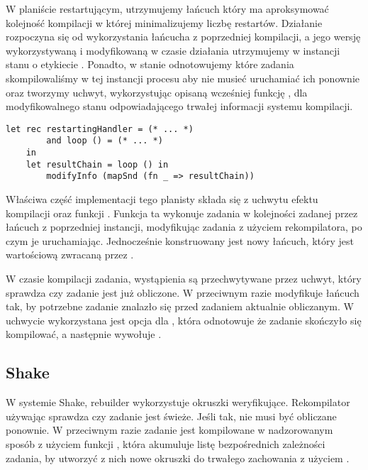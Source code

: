 

W planiście restartującym, utrzymujemy łańcuch który ma aproksymować kolejność kompilacji w której minimalizujemy liczbę restartów. Działanie rozpoczyna się od wykorzystania łańcucha z poprzedniej kompilacji, a jego wersję wykorzystywaną i modyfikowaną w czasie działania utrzymujemy w instancji stanu o etykiecie . Ponadto, w stanie  odnotowujemy które zadania skompilowaliśmy w tej instancji procesu aby nie musieć uruchamiać ich ponownie oraz tworzymy uchwyt, wykorzystując opisaną wcześniej funkcję , dla modyfikowalnego stanu odpowiadającego trwałej informacji systemu kompilacji.


\vspace{-1.25em}
\begin{lstlisting}[style=Haleff-long]
    let rec restartingHandler = (* ... *)
        and loop () = (* ... *)
    in
    let resultChain = loop () in
        modifyInfo (mapSnd (fn _ => resultChain))
\end{lstlisting}

Właściwa część implementacji tego planisty składa się z uchwytu efektu kompilacji  oraz funkcji . Funkcja ta wykonuje zadania w kolejności zadanej przez łańcuch z poprzedniej instancji, modyfikując zadania z użyciem rekompilatora, po czym je uruchamiając. Jednocześnie konstruowany jest nowy łańcuch, który jest wartościową zwracaną przez .



W czasie kompilacji zadania, wystąpienia  są przechwytywane przez uchwyt, który sprawdza czy zadanie jest już obliczone. W przeciwnym razie modyfikuje łańcuch tak, by potrzebne zadanie znalazło się przed zadaniem aktualnie obliczanym. W uchwycie wykorzystana jest opcja dla , która odnotowuje że zadanie skończyło się kompilować, a następnie wywołuje .

\subsection{Shake}



W systemie Shake, rebuilder wykorzystuje okruszki weryfikujące. Rekompilator używając  sprawdza czy zadanie jest świeże. Jeśli tak, nie musi być obliczane ponownie. W przeciwnym razie zadanie jest kompilowane w nadzorowanym sposób z użyciem funkcji , która akumuluje listę bezpośrednich zależności zadania, by utworzyć z nich nowe okruszki do trwałego zachowania z użyciem .

